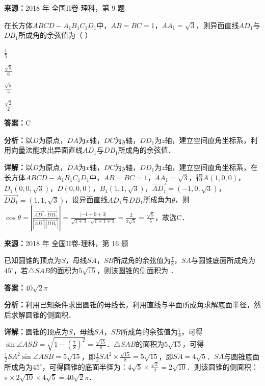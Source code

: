 \begin{question}[points=5]
\textbf{来源：}2018 年 全国II卷-理科，第 9 题\par
在长方体$ABCD-A_1B_1C_1D_1$中，$AB=BC=1$，$AA_1=\sqrt{3}$，则异面直线$AD_1$与$DB_1$所成角的余弦值为（        ）
\begin{choices}
  \item $\frac{1}{5}$
  \item $\frac{\sqrt{5}}{6}$
  \item $\frac{\sqrt{5}}{5}$
  \item $\frac{\sqrt{2}}{2}$
\end{choices}
\begin{solution}
\textbf{答案：}C

\textbf{分析：}以$D$为原点，$DA$为$x$轴，$DC$为$y$轴，$DD_1$为$z$轴，建立空间直角坐标系，利用向量法能求出异面直线$AD_1$与$DB_1$所成角的余弦值．

\textbf{详解：}以$D$为原点，$DA$为$x$轴，$DC$为$y$轴，$DD_1$为$z$轴，建立空间直角坐标系，在长方体$ABCD-A_1B_1C_1D_1$中，$AB=BC=1$，$AA_1=\sqrt{3}$，得$A(1,0,0)$，$D_1(0,0,\sqrt{3})$，$D(0,0,0)$，$B_1(1,1,\sqrt{3})$，$\overrightarrow{AD_1}=(-1,0,\sqrt{3})$，$\overrightarrow{DB_1}=(1,1,\sqrt{3})$，设异面直线$AD_1$与$DB_1$所成角为$\theta$，则$\cos\theta=\left|\frac{\overrightarrow{AD_1}\cdot\overrightarrow{DB_1}}{|\overrightarrow{AD_1}||\overrightarrow{DB_1}|}\right|=\frac{|-1+0+3|}{\sqrt{1+3}\cdot\sqrt{1+1+3}}=\frac{2}{2\sqrt{5}}=\frac{\sqrt{5}}{5}$，故选C．
\end{solution}
\end{question}

\begin{question}[points=5]
\textbf{来源：}2018 年 全国II卷-理科，第 16 题\par
已知圆锥的顶点为$S$，母线$SA$，$SB$所成角的余弦值为$\frac{7}{8}$，$SA$与圆锥底面所成角为$45^\circ$，若$\triangle SAB$的面积为$5\sqrt{15}$，则该圆锥的侧面积为          ．
\fillin[{$40\sqrt{2}\pi$}]
\begin{solution}
\textbf{答案：}$40\sqrt{2}\pi$

\textbf{分析：}利用已知条件求出圆锥的母线长，利用直线与平面所成角求解底面半径，然后求解圆锥的侧面积．

\textbf{详解：}圆锥的顶点为$S$，母线$SA$，$SB$所成角的余弦值为$\frac{7}{8}$，可得$\sin\angle ASB=\sqrt{1-(\frac{7}{8})^2}=\frac{\sqrt{15}}{8}$．$\triangle SAB$的面积为$5\sqrt{15}$，可得$\frac{1}{2}SA^2\sin\angle ASB=5\sqrt{15}$，即$\frac{1}{2}SA^2\times\frac{\sqrt{15}}{8}=5\sqrt{15}$，即$SA=4\sqrt{5}$．$SA$与圆锥底面所成角为$45^\circ$，可得圆锥的底面半径为：$4\sqrt{5}\times\frac{\sqrt{2}}{2}=2\sqrt{10}$．则该圆锥的侧面积：$\pi\times2\sqrt{10}\times4\sqrt{5}=40\sqrt{2}\pi$．
\end{solution}
\end{question}

